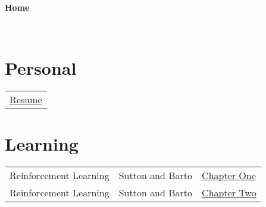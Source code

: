 \documentclass[11pt]{article}
\begin{document}
~
~

\begin{center}
  {
	\fontsize{1.5cm}{1.5cm}
        \textcolor{CalPolyGreen}{\textbf{Home}}
  }

\end{center}

~
~


\section*{\textcolor{CalPolyGreen}{Personal}}
\begin{tabular}{l}
	\href{https://lilcpuppy.github.io/resume.html}{Resume}
\end{tabular}

\section*{\textcolor{CalPolyGreen}{Learning}}
\begin{tabular}{lll}
	Reinforcement Learning	& Sutton and Barto  & \href{https://lilcpuppy.github.io/reinforcement_learning_chapter_one.html}{Chapter One}   \\
	Reinforcement Learning	& Sutton and Barto  & \href{https://lilcpuppy.github.io/reinforcement_learning_chapter_two.html}{Chapter Two}   \\
\end{tabular}
\end{document}
